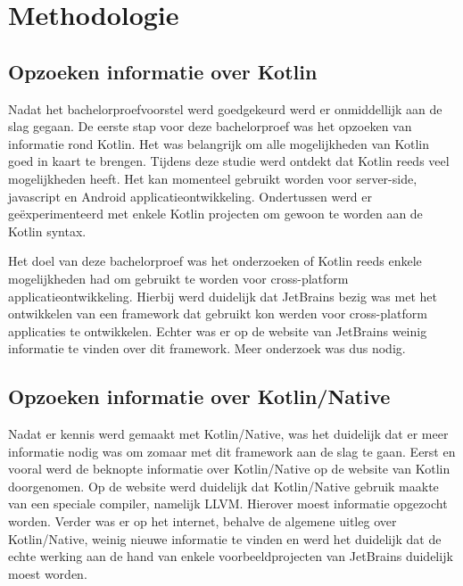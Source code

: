 
\chapter{Methodologie}
\label{ch:methodologie}


\section{Opzoeken informatie over Kotlin}
Nadat het bachelorproefvoorstel werd goedgekeurd werd er onmiddellijk aan de slag gegaan. De eerste stap voor deze bachelorproef was het opzoeken van informatie rond Kotlin. Het was belangrijk om alle mogelijkheden van Kotlin goed in kaart te brengen. Tijdens deze studie werd ontdekt dat Kotlin reeds veel mogelijkheden heeft. Het kan momenteel gebruikt worden voor server-side, javascript en Android applicatieontwikkeling. Ondertussen werd er geëxperimenteerd met enkele Kotlin projecten om gewoon te worden aan de Kotlin syntax.

Het doel van deze bachelorproef was het onderzoeken of Kotlin reeds enkele mogelijkheden had om gebruikt te worden voor cross-platform applicatieontwikkeling. Hierbij werd duidelijk dat JetBrains bezig was met het ontwikkelen van een framework dat gebruikt kon werden voor cross-platform applicaties te ontwikkelen. Echter was er op de website van JetBrains weinig informatie te vinden over dit framework. Meer onderzoek was dus nodig.

\section{Opzoeken informatie over Kotlin/Native}
\label{sec:infokn}
Nadat er kennis werd gemaakt met Kotlin/Native, was het duidelijk dat er meer informatie nodig was om zomaar met dit framework aan de slag te gaan. Eerst en vooral werd de beknopte informatie over Kotlin/Native op de website van Kotlin doorgenomen. Op de website werd duidelijk dat Kotlin/Native gebruik maakte van een speciale compiler, namelijk LLVM. Hierover moest informatie opgezocht worden. Verder was er op het internet, behalve de algemene uitleg over Kotlin/Native, weinig nieuwe informatie te vinden en werd het duidelijk dat de echte werking aan de hand van enkele voorbeeldprojecten van JetBrains duidelijk moest worden.

